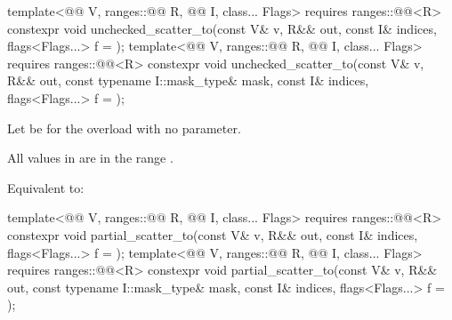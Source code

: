 \begin{itemdecl}
template<@@ V, ranges::@@ R, @@ I, class... Flags>
  requires ranges::@@<R>
  constexpr void unchecked_scatter_to(const V& v, R&& out, const I& indices,
                                      flags<Flags...> f = {});
template<@@ V, ranges::@@ R, @@ I, class... Flags>
  requires ranges::@@<R>
  constexpr void unchecked_scatter_to(const V& v, R&& out, const typename I::mask_type& mask,
                                      const I& indices, flags<Flags...> f = {});
\end{itemdecl}

\begin{itemdescr}
\pnum
Let  be  for the overload with
no  parameter.

\pnum
\expects
All values in  are in
the range .

\pnum
\effects
Equivalent to: 
\end{itemdescr}

\begin{itemdecl}
template<@@ V, ranges::@@ R, @@ I, class... Flags>
  requires ranges::@@<R>
  constexpr void
  partial_scatter_to(const V& v, R&& out, const I& indices, flags<Flags...> f = {});
template<@@ V, ranges::@@ R, @@ I, class... Flags>
  requires ranges::@@<R>
  constexpr void partial_scatter_to(const V& v, R&& out, const typename I::mask_type& mask,
                                    const I& indices, flags<Flags...> f = {});
\end{itemdecl}

